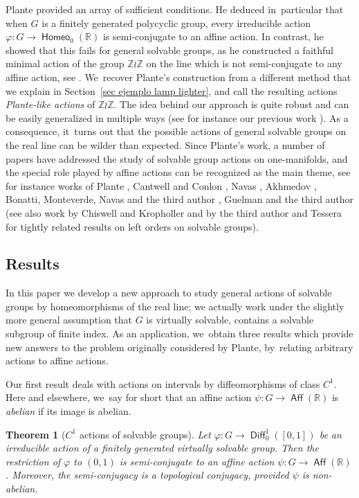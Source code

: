 \documentclass[JEP,XML,SOM,Unicode,NoFloatCountersInSection,published]{cedram}
\newtheorem{introthm}{Theorem}
\theoremstyle{definition}
\DeclareMathOperator{\Aff}{\mathsf{Aff}}
\DeclareMathOperator{\Diff}{\mathsf{Diff}}
\DeclareMathOperator{\homeo}{\mathsf{Homeo}}
\newcommand{\R}{\mathbb{R}}
\newcommand{\Z}{\mathbb Z}
\begin{document}
Plante provided an array of sufficient conditions. He deduced in~particular that when $G$ is a finitely generated polycyclic group, every irreducible action $\varphi\colon G \to \homeo_0(\R)$ is semi-conjugate to an affine action. In contrast, he showed that this fails for general solvable groups, as he constructed a faithful minimal action of the group $\Z \wr \Z$ on the line which is not semi-conjugate to any affine action, see \hbox{\cite[\S 5]{Plante}}. We~recover Plante's construction from a different method that we explain in Section~\ref{sec ejemplo lamp lighter}, and call the resulting actions \emph{Plante-like actions} of $\Z\wr\Z$. The idea behind our approach is quite robust and can be easily generalized in multiple ways (see for instance our previous work \cite[Ex.\,8.1.8]{BMRT}). As a consequence, it~turns out that the possible actions of general solvable groups on the real line can be wilder than expected. Since Plante's work, a number of papers have addressed the study of solvable group actions on one-manifolds, and the special role played by affine actions can be recognized as the main theme, see for instance works of Plante \cite{PlanteContinuous}, Cantwell and Conlon \cite{CC}, Navas \cite{NavasResolubles,NavasAmenable}, Akhmedov \cite{Akhmedov_Z,Akhmedov}, Bonatti, Monteverde, Navas and the third author \cite{BMNR}, Guelman and the third author \cite{GuelmanRivas} (see also work by Chiswell and Kropholler \cite{ChiswellKropholler} and by the third author and Tessera \cite{RivasTessera} for tightly related results on left orders on solvable groups).

\subsection{Results}
In this paper we develop a new approach to study general actions of solvable groups by homeomorphisms of the real line; we actually work under the slightly more general assumption that $G$ is virtually solvable, \ie contains a solvable subgroup of finite index. As an application, we~obtain three results which provide new answers to the problem originally considered by Plante, by~relating arbitrary actions to affine actions.

Our first result deals with actions on intervals by diffeomorphisms of class $C^1$. Here and elsewhere, we~say for short that an affine action $\psi \colon G\to \Aff(\R)$ is \emph{abelian} if its image is abelian.

\begin{introthm}[$C^1$ actions of solvable groups]\label{mthm.C1}
Let $\varphi\colon G\to \Diff^1_0([0, 1])$ be an irreducible action of a finitely generated virtually solvable group. Then the restriction of $\varphi$ to $(0, 1)$ is semi-conjugate to an affine action $\psi\colon G\to \Aff(\R)$. Moreover, the semi-conjugacy is a topological conjugacy, provided $\psi$ is non-abelian.
\end{introthm}
\end{document}

